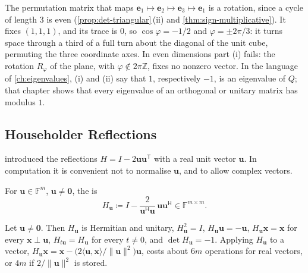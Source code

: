 The permutation matrix that maps $\mathbf e_1\mapsto\mathbf e_2\mapsto\mathbf e_3\mapsto\mathbf e_1$ is a rotation, since a cycle of length $3$ is even (\cref{prop:det-triangular}\,(ii) and \cref{thm:sign-multiplicative}). It fixes $(1,1,1)$, and its trace is $0$, so $\cos\varphi=-1/2$ and $\varphi=\pm2\pi/3$: it turns space through a third of a full turn about the diagonal of the unit cube, permuting the three coordinate axes. In even dimensions part (i) fails: the rotation $R_\varphi$ of the plane, with $\varphi\notin2\pi\mathbb Z$, fixes no nonzero vector. In the language of \cref{ch:eigenvalues}, (i) and (ii) say that $1$, respectively $-1$, is an eigenvalue of $Q$; that chapter shows that every eigenvalue of an orthogonal or unitary matrix has modulus $1$.

\subsection{Householder Reflections}

 introduced the reflections $H=I-2\mathbf u\mathbf u^{\mathsf T}$ with a real unit vector $\mathbf u$. In computation it is convenient not to normalise $\mathbf u$, and to allow complex vectors.

\begin{definition}
\label{def:householder}
For $\mathbf u\in\mathbb F^m$, $\mathbf u\ne\mathbf 0$, the  is
\[
H_{\mathbf u}\coloneqq I-\frac{2}{\mathbf u^{\mathsf H}\mathbf u}\,\mathbf u\mathbf u^{\mathsf H}\in\mathbb F^{m\times m} .
\]
\end{definition}

\begin{proposition}
\label{prop:householder-general}
Let $\mathbf u\ne\mathbf 0$. Then $H_{\mathbf u}$ is Hermitian and unitary, $H_{\mathbf u}^2=I$, $H_{\mathbf u}\mathbf u=-\mathbf u$, $H_{\mathbf u}\mathbf x=\mathbf x$ for every $\mathbf x\perp\mathbf u$, $H_{t\mathbf u}=H_{\mathbf u}$ for every $t\ne0$, and $\det H_{\mathbf u}=-1$. Applying $H_{\mathbf u}$ to a vector, $H_{\mathbf u}\mathbf x=\mathbf x-\bigl(2\langle\mathbf u,\mathbf x\rangle/\|\mathbf u\|^2\bigr)\mathbf u$, costs about $6m$ operations for real vectors, or $4m$ if $2/\|\mathbf u\|^2$ is stored.
\end{proposition}


